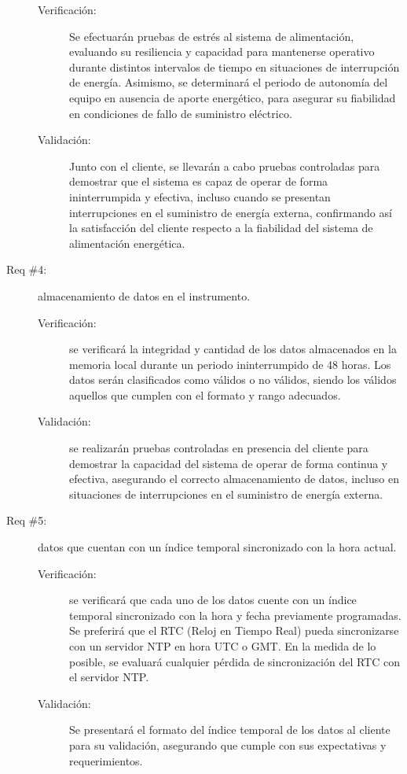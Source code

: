 \begin{description}
	\begin{description}
		\item [Verificación:] Se efectuarán pruebas de estrés al sistema de alimentación, evaluando su resiliencia y capacidad para mantenerse operativo durante distintos intervalos de tiempo en situaciones de interrupción de energía. Asimismo, se determinará el periodo de autonomía del equipo en ausencia de aporte energético, para asegurar su fiabilidad en condiciones de fallo de suministro eléctrico.
		\item [Validación:] Junto con el cliente, se llevarán a cabo pruebas controladas para demostrar que el sistema es capaz de operar de forma ininterrumpida y efectiva, incluso cuando se presentan interrupciones en el suministro de energía externa, confirmando así la satisfacción del cliente respecto a la fiabilidad del sistema de alimentación energética.
	\end{description}


	\item [Req \#4:] almacenamiento de datos en el instrumento.
	
	\begin{description}
		\item [Verificación:] se verificará la integridad y cantidad de los datos almacenados en la memoria local durante un periodo ininterrumpido de 48 horas. Los datos serán clasificados como válidos o no válidos, siendo los válidos aquellos que cumplen con el formato y rango adecuados.
		\item [Validación:] se realizarán pruebas controladas en presencia del cliente para demostrar la capacidad del sistema de operar de forma continua y efectiva, asegurando el correcto almacenamiento de datos, incluso en situaciones de interrupciones en el suministro de energía externa.
	\end{description}


	\item [Req \#5:] datos que cuentan con un índice temporal sincronizado con la hora actual.
	
	\begin{description}
		\item [Verificación:] se verificará que cada uno de los datos cuente con un índice temporal sincronizado con la hora y fecha previamente programadas. Se preferirá que el RTC (Reloj en Tiempo Real) pueda sincronizarse con un servidor NTP en hora UTC o GMT. En la medida de lo posible, se evaluará cualquier pérdida de sincronización del RTC con el servidor NTP.
		\item [Validación:] Se presentará el formato del índice temporal de los datos al cliente para su validación, asegurando que cumple con sus expectativas y requerimientos.
	\end{description}


\end{description}
